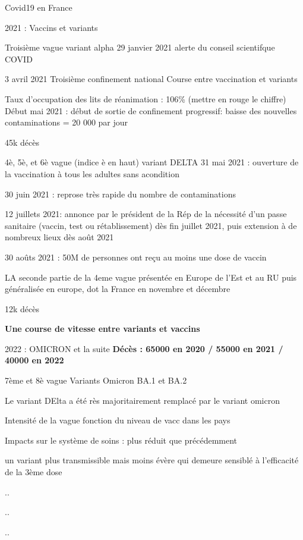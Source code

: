 \documentclass[
  ignorenonframetext,
]{beamer}
\begin{document}
\begin{frame}{Covid19 en France}
\begin{block}{2021 : Vaccins et variants}
\begin{block}{Troisième vague variant alpha}
29 janvier 2021 alerte du conseil scientifque COVID

3 avril 2021 Troisième confinement national Course entre vaccination et
variants

Taux d'occupation des lits de réanimation : 106\% (mettre en rouge le
chiffre)\\
Début mai 2021 : début de sortie de confinement progressif: baisse des
nouvelles contaminations = 20 000 par jour

45k décès
\end{block}

\begin{block}{4è, 5è, et 6è vague (indice è en haut) variant DELTA}
\protect\hypertarget{uxe8-5uxe8-et-6uxe8-vague-indice-uxe8-en-haut-variant-delta}{}
31 mai 2021 : ouverture de la vaccination à tous les adultes sans
acondition

30 juin 2021 : reprose très rapide du nombre de contaminations

12 juillets 2021: annonce par le président de la Rép de la nécessité
d'un passe sanitaire (vaccin, test ou rétablissement) dès fin juillet
2021, puis extension à de nombreux lieux dès août 2021

30 aoûts 2021 : 50M de personnes ont reçu au moins une dose de vaccin

LA seconde partie de la 4eme vague présentée en Europe de l'Est et au RU
puis généralisée en europe, dot la France en novembre et décembre

12k décès

\textbf{Une course de vitesse entre variants et vaccins}
\end{block}
\end{block}

\begin{block}{2022 : OMICRON et la suite}
\protect\hypertarget{omicron-et-la-suite}{}
\textbf{Décès : 65000 en 2020 / 55000 en 2021 / 40000 en 2022}

7ème et 8è vague Variants Omicron BA.1 et BA.2

Le variant DElta a été rès majoritairement remplacé par le variant
omicron

Intensité de la vague fonction du niveau de vacc dans les pays

Impacts sur le système de soins : plus réduit que précédemment

un variant plus transmissible mais moins évère qui demeure sensiblé à
l'efficacité de la 3ème dose

..

..

..
\end{block}
\end{frame}
\end{document}
